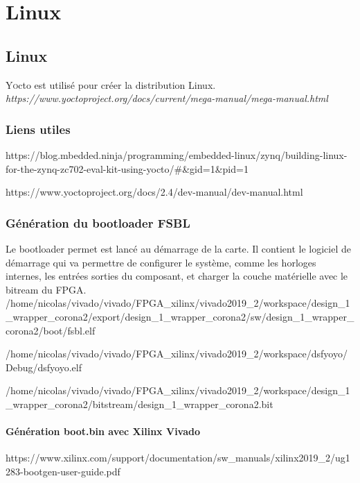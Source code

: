 \newpage
\chapter{Linux}
\section{Linux}

\lettrine[lines=1]{Y}octo est utilisé pour créer la distribution Linux.
\\
\textit{https://www.yoctoproject.org/docs/current/mega-manual/mega-manual.html}


\subsection{Liens utiles}

https://blog.mbedded.ninja/programming/embedded-linux/zynq/building-linux-for-the-zynq-zc702-eval-kit-using-yocto/#&gid=1&pid=1

https://www.yoctoproject.org/docs/2.4/dev-manual/dev-manual.html

\subsection{Génération du bootloader FSBL}
Le bootloader permet est lancé au démarrage de la carte. Il contient le logiciel de démarrage qui va permettre de configurer le système, comme les horloges internes, les entrées sorties du composant, et charger la couche matérielle avec le bitream du FPGA.
\\
/home/nicolas/vivado/vivado/FPGA_xilinx/vivado2019_2/workspace/design_1_wrapper_corona2/export/design_1_wrapper_corona2/sw/design_1_wrapper_corona2/boot/fsbl.elf

/home/nicolas/vivado/vivado/FPGA\_xilinx/vivado2019\_2/workspace/dsfyoyo/Debug/dsfyoyo.elf

/home/nicolas/vivado/vivado/FPGA\_xilinx/vivado2019\_2/workspace/design_1_wrapper_corona2/bitstream/design\_1\_wrapper_corona2.bit


\subsubsection{Génération boot.bin avec Xilinx Vivado}

https://www.xilinx.com/support/documentation/sw_manuals/xilinx2019_2/ug1283-bootgen-user-guide.pdf


